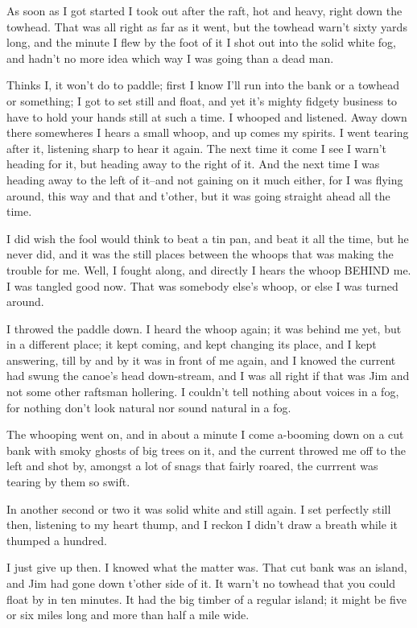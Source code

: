 As soon as I got started I took out after the raft, hot and heavy, right
down the towhead.  That was all right as far as it went, but the towhead
warn't sixty yards long, and the minute I flew by the foot of it I shot
out into the solid white fog, and hadn't no more idea which way I was
going than a dead man.

Thinks I, it won't do to paddle; first I know I'll run into the bank or a
towhead or something; I got to set still and float, and yet it's mighty
fidgety business to have to hold your hands still at such a time.  I
whooped and listened.  Away down there somewheres I hears a small whoop,
and up comes my spirits.  I went tearing after it, listening sharp to
hear it again.  The next time it come I see I warn't heading for it, but
heading away to the right of it.  And the next time I was heading away to
the left of it--and not gaining on it much either, for I was flying
around, this way and that and t'other, but it was going straight ahead
all the time.

I did wish the fool would think to beat a tin pan, and beat it all the
time, but he never did, and it was the still places between the whoops
that was making the trouble for me.  Well, I fought along, and directly I
hears the whoop BEHIND me.  I was tangled good now.  That was somebody
else's whoop, or else I was turned around.

I throwed the paddle down.  I heard the whoop again; it was behind me
yet, but in a different place; it kept coming, and kept changing its
place, and I kept answering, till by and by it was in front of me again,
and I knowed the current had swung the canoe's head down-stream, and I
was all right if that was Jim and not some other raftsman hollering.  I
couldn't tell nothing about voices in a fog, for nothing don't look
natural nor sound natural in a fog.

The whooping went on, and in about a minute I come a-booming down on a
cut bank with smoky ghosts of big trees on it, and the current throwed me
off to the left and shot by, amongst a lot of snags that fairly roared,
the currrent was tearing by them so swift.

In another second or two it was solid white and still again.  I set
perfectly still then, listening to my heart thump, and I reckon I didn't
draw a breath while it thumped a hundred.

I just give up then.  I knowed what the matter was.  That cut bank was an
island, and Jim had gone down t'other side of it.  It warn't no towhead
that you could float by in ten minutes.  It had the big timber of a
regular island; it might be five or six miles long and more than half a
mile wide.

